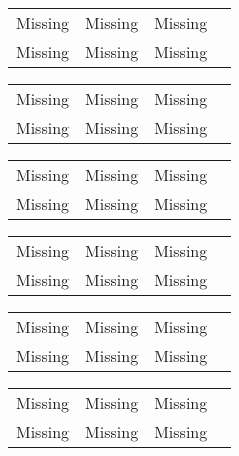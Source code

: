 \begin{minipage}{\columnwidth}
\begin{tabular}{lccc}
Missing & Missing & Missing \\
Missing & Missing & Missing \\
\end{tabular}
\end{minipage}

\begin{minipage}{\columnwidth}
\begin{tabular}{lccc}
Missing & Missing & Missing \\
Missing & Missing & Missing \\
\end{tabular}
\end{minipage}

\begin{minipage}{\columnwidth}
\begin{tabular}{lccc}
Missing & Missing & Missing \\
Missing & Missing & Missing \\
\end{tabular}
\end{minipage}

\begin{minipage}{\columnwidth}
\begin{tabular}{lccc}
Missing & Missing & Missing \\
Missing & Missing & Missing \\
\end{tabular}
\end{minipage}

\begin{minipage}{\columnwidth}
\begin{tabular}{lccc}
Missing & Missing & Missing \\
Missing & Missing & Missing \\
\end{tabular}
\end{minipage}

\begin{minipage}{\columnwidth}
\begin{tabular}{lccc}
Missing & Missing & Missing \\
Missing & Missing & Missing \\
\end{tabular}
\end{minipage}

